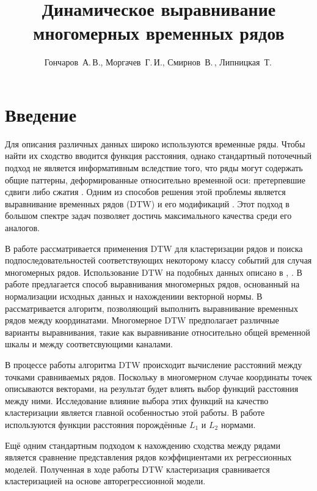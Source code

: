 \documentclass[12pt,twoside]{article}
\title
        {Динамическое выравнивание многомерных временных рядов}
\author
        {Гончаров~А.\,В., Моргачев~Г.\,И., Смирнов~В.\,, Липницкая~Т.\,} %
\begin{document}
    \maketitle
    \setcounter{secnumdepth}{3}
    \section{Введение}\label{intro}
        
        Для описания различных данных широко используются временные ряды.
        Чтобы найти их сходство вводится функция расстояния, однако стандартный поточечный подход не является информативным вследствие того,
        что ряды могут содержать общие паттерны, деформированные относительно временной оси: претерпевшие сдвиги либо сжатия \cite{01f4ab11a9ff49ff909094a135dcfe33}.
        Одним из способов решения этой проблемы является выравнивание временных рядов (DTW)  \cite{Keogh01derivativedynamic} и его модификаций \cite{journals/ida/SalvadorC07}.
        Этот подход в большом спектре задач позволяет достичь максимального качества среди его аналогов.
        
        В работе рассматривается применения DTW для кластеризации рядов и поиска подпоследовательностей
        соответствующих некоторому классу событий для случая многомерных рядов.
        Использование DTW на подобных данных описано в \cite{Holt2007}, \cite{Sanguansat2012MultipleMS}.
        В работе \cite{Holt2007} предлагается способ выравнивания многомерных рядов, основанный на нормализации исходных данных и нахождениии векторной нормы.
        В \cite{Sanguansat2012MultipleMS} рассматривается алгоритм, позволяющий выполнить выравнивание временных рядов между координатами. 
        Многомерное DTW предполагает различные варианты выравнивания, такие как выравнивание относительно общей временной шкалы и между соответсвующими каналами.
        
        В процессе работы алгоритма DTW происходит вычисление расстояний между точками сравниваемых рядов.
        Поскольку в многомерном случае координаты точек описываются векторами, на результат будет влиять выбор функций расстояния между ними.
        Исследование влияние выбора этих функций на качество кластеризации является главной особенностью этой работы.
        В работе используются функции расстояния порождённые $L_1$ и $L_2$ нормами.
        
        Ещё одним стандартным подходом к нахождению сходства между рядами является сравнение представления рядов коэффициентами их регрессионных моделей.
        Полученная в ходе работы DTW кластеризация сравнивается кластеризацией на основе авторегрессионной модели.
    
\end{document}
